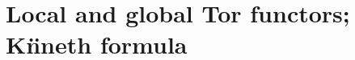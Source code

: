 \section{Local and global Tor functors; K\"nneth formula}
\label{section-local-and-global-tor-functors-kunneth-formula}

